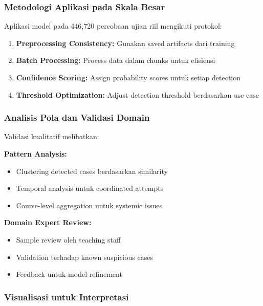 \subsubsection{Metodologi Aplikasi pada Skala Besar}
\label{sec:aplikasiSkalaBesar}

Aplikasi model pada 446,720 percobaan ujian riil mengikuti protokol:

\begin{enumerate}
    \item \textbf{Preprocessing Consistency:} Gunakan saved artifacts dari training
    \item \textbf{Batch Processing:} Process data dalam chunks untuk efisiensi
    \item \textbf{Confidence Scoring:} Assign probability scores untuk setiap detection
    \item \textbf{Threshold Optimization:} Adjust detection threshold berdasarkan use case
\end{enumerate}

\subsubsection{Analisis Pola dan Validasi Domain}
\label{sec:analisisPolaValidasi}

Validasi kualitatif melibatkan:

\textbf{Pattern Analysis:}
\begin{itemize}
    \item Clustering detected cases berdasarkan similarity
    \item Temporal analysis untuk coordinated attempts
    \item Course-level aggregation untuk systemic issues
\end{itemize}

\textbf{Domain Expert Review:}
\begin{itemize}
    \item Sample review oleh teaching staff
    \item Validation terhadap known suspicious cases
    \item Feedback untuk model refinement
\end{itemize}

\subsubsection{Visualisasi untuk Interpretasi}
\label{sec:visualisasiInterpretasi}

